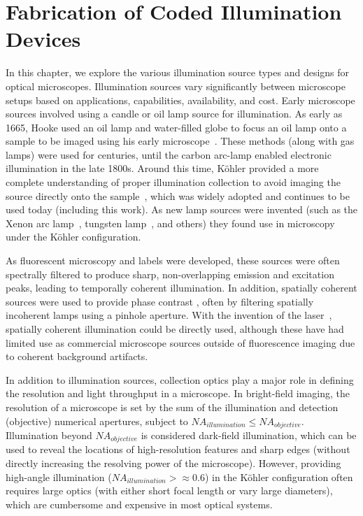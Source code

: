 \chapter{Fabrication of Coded Illumination Devices}

In this chapter, we explore the various illumination source types and designs for optical microscopes. Illumination sources vary significantly between microscope setups based on applications, capabilities, availability, and cost. Early microscope sources involved using a candle or oil lamp source for illumination. As early as 1665, Hooke used an oil lamp and water-filled globe to focus an oil lamp onto a sample to be imaged using his early microscope~\cite{hookeMicrographica}. These methods (along with gas lamps) were used for centuries, until the carbon arc-lamp enabled electronic illumination in the late 1800s. Around this time, K\"ohler provided a more complete understanding of proper illumination collection to avoid imaging the source directly onto the sample~\cite{kohler1893neues}, which was widely adopted and continues to be used today (including this work). As new lamp sources were invented (such as the Xenon arc lamp~\cite{anderson1951xenon}, tungsten lamp~\cite{edison1880electric}, and others) they found use in microscopy under the K\"ohler configuration. 

As fluorescent microscopy and labels were developed, these sources were often spectrally filtered to produce sharp, non-overlapping emission and excitation peaks, leading to temporally coherent illumination. In addition, spatially coherent sources were used to provide phase contrast \cite{smithDIC, zernike1942phase}, often by filtering spatially incoherent lamps using a pinhole aperture. With the invention of the laser~\cite{schawlow1958infrared}, spatially coherent illumination could be directly used, although these have had limited use as commercial microscope sources outside of fluorescence imaging due to coherent background artifacts.

In addition to illumination sources, collection optics play a major role in defining the resolution and light throughput in a microscope. In bright-field imaging, the resolution of a microscope is set by the sum of the illumination and detection (objective) numerical apertures, subject to $NA_{illumination} \leq NA_{objective}$. Illumination beyond $NA_{objective}$ is considered dark-field illumination, which can be used to reveal the locations of high-resolution features and sharp edges (without directly increasing the resolving power of the microscope). However, providing high-angle illumination ($NA_{illumination} >\approx 0.6$) in the K\"ohler configuration often requires large optics (with either short focal length or vary large diameters), which are cumbersome and expensive in most optical systems.

